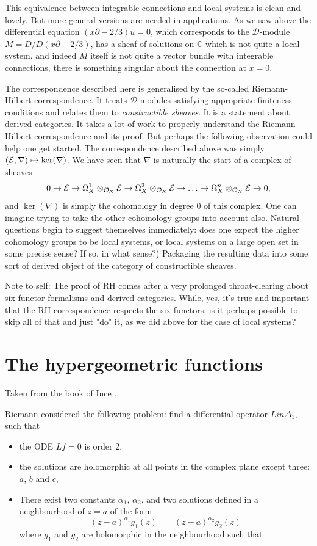 \documentclass[12pt]{article}
\theoremstyle{plain}
\theoremstyle{definition}
\numberwithin{equation}{section}
\newcommand{\Om}{\Omega}
\newcommand{\D}{\Delta}
\newcommand{\C}{\mathbb{C}}
\newcommand{\CD}{\mathcal{D}}
\newcommand{\OO}{\mathcal{O}}
\begin{document}
This equivalence between integrable connections and local systems is clean and lovely. But more general versions are needed in applications. As we saw above the differential equation $(x \partial - 2/3)u = 0$, which corresponds to the $\CD$-module $M = D / D (x \partial - 2/3)$, has a sheaf of solutions on $\C$ which is not quite a local system, and indeed $M$ itself is not quite a vector bundle with integrable connections, there is something singular about the connection at $x = 0$. 

The correspondence described here is generalised by the so-called Riemann-Hilbert correspondence. It treats $\CD$-modules satisfying appropriate finiteness conditions and relates them to \emph{constructible sheaves}. It is a statement about derived categories. It takes a lot of work to properly understand the Riemann-Hilbert correspondence and its proof. But perhaps the following observation could help one get started. The correspondence described above was simply $(\mathcal{E}, \nabla) \mapsto \ker(\nabla)$. We have seen that $\nabla$ is naturally the start of a complex of sheaves
\[
0 \rightarrow \E \rightarrow \Om_X^1 \otimes_{\OO_X} \E \rightarrow \Om_X^2 \otimes_{\OO_X} \E \rightarrow \ldots  \rightarrow \Om_X^n \otimes_{\OO_X} \E \rightarrow 0,
\]
and $\ker(\nabla)$ is simply the cohomology in degree $0$ of this complex. One can imagine trying to take the other cohomology groups into account also. Natural questions begin to suggest themselves immediately: does one expect the higher cohomology groups to be local systems, or local systems on a large open set in some precise sense? If so, in what sense?) Packaging the resulting data into some sort of derived object of the category of constructible sheaves.

{\color{red}Note to self: The proof of RH comes after a very prolonged throat-clearing about six-functor formalisms and derived categories. While, yes, it's true and important that the RH correspondence respects the six functors, is it perhaps possible to skip all of that and just "do" it, as we did above for the case of local systems?}

\section{The hypergeometric functions}

Taken from the book of Ince \cite[p. 389]{Ince}.

Riemann considered the following problem: find a differential operator $L
in \D_1$, such that
\begin{itemize}
\item the ODE $L f = 0$ is order $2$,

\item the solutions are holomorphic at all points in the complex plane except three: $a$, $b$ and $c$,

\item There exist two constants $\alpha_1$, $\alpha_2$, and two solutions defined in a neighbourhood of $z = a$ of the form
\[
(z-a)^{\alpha_1} g_1(z) \qquad (z-a)^{\alpha_2} g_2(z)
\]
where $g_1$ and $g_2$ are holomorphic in the neighbourhood
such that
\end{itemize}
\end{document}
